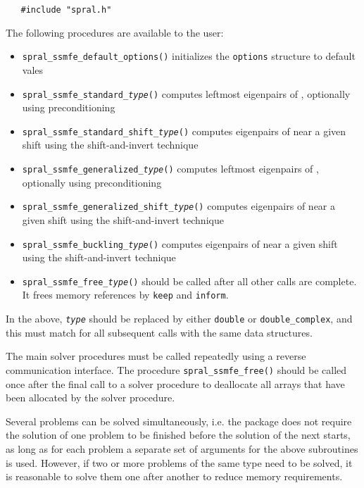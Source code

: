 \begin{verbatim}
   #include "spral.h"
\end{verbatim}

\medskip

\noindent The following procedures are available to the user:
%
\begin{itemize}
\vspace{-0.1cm}
\item {\tt spral\_ssmfe\_default\_options()} initializes the \texttt{options} structure to default vales
\item {\tt spral\_ssmfe\_standard\_\textit{type}()} 
computes leftmost eigenpairs of , 
optionally using preconditioning
\item {\tt spral\_ssmfe\_standard\_shift\_\textit{type}()} 
computes eigenpairs of  near a given shift
using the shift-and-invert technique
\item {\tt spral\_ssmfe\_generalized\_\textit{type}()} 
computes leftmost eigenpairs of 
, optionally using preconditioning
\item {\tt spral\_ssmfe\_generalized\_shift\_\textit{type}()} 
computes eigenpairs of 
 near a given shift
using the shift-and-invert technique
\item {\tt spral\_ssmfe\_buckling\_\textit{type}()} 
computes eigenpairs of 
 near a given shift
using the shift-and-invert technique
\item {\tt spral\_ssmfe\_free\_\textit{type}()}  should be called after all other calls
are complete. It frees memory references by \texttt{keep} and \texttt{inform}.
%
\end{itemize}

In the above, \texttt{\textit{type}} should be replaced by either \texttt{double} or \texttt{double\_complex}, and this must match for all subsequent calls with the same data structures.

The main solver procedures
must be called repeatedly using
a reverse communication interface.
The procedure \texttt{spral\_ssmfe\_free()}
should be called once after the
final call to 
a solver procedure
to deallocate all arrays 
that have been allocated by
the solver procedure.

Several problems can be solved simultaneously,
i.e. the package does not require the solution of
one problem to be finished before the solution of
the next starts, as long as for each problem a separate set
of arguments for the above subroutines is used.
However, if two or more problems of the same type
need to be solved, it is reasonable to solve them one
after another  to reduce  memory requirements.
\fi

